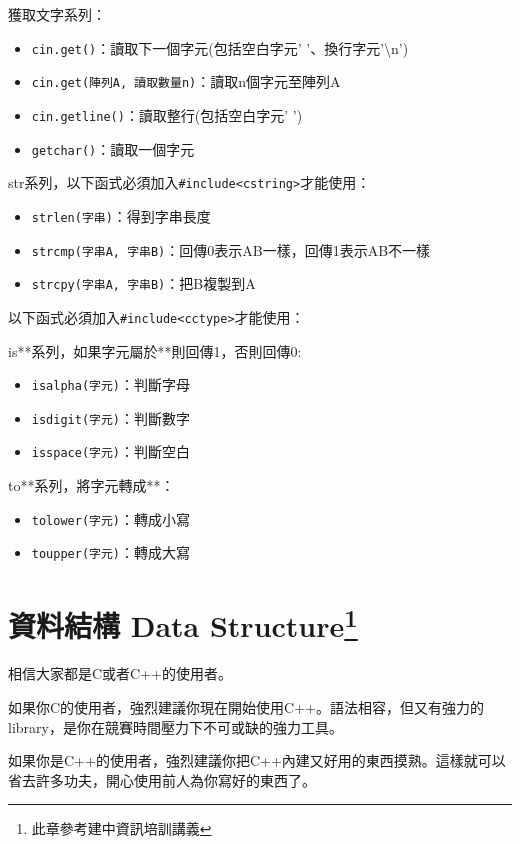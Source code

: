 \documentclass[a4paper, 11pt, oneside]{book}
\begin{document}
獲取文字系列：
\begin{itemize}
    \item \texttt{cin.get()}：讀取下一個字元(包括空白字元' '、換行字元'\textbackslash{}n')
    \item \texttt{cin.get(陣列A, 讀取數量n)}：讀取n個字元至陣列A
    \item \texttt{cin.getline()}：讀取整行(包括空白字元' ')
    \item \texttt{getchar()}：讀取一個字元
\end{itemize}
str系列，以下函式必須加入\texttt{\#include<cstring>}才能使用：
\begin{itemize}
    \item \texttt{strlen(字串)}：得到字串長度
    \item \texttt{strcmp(字串A, 字串B)}：回傳0表示AB一樣，回傳1表示AB不一樣
    \item \texttt{strcpy(字串A, 字串B)}：把B複製到A
\end{itemize}
以下函式必須加入\texttt{\#include<cctype>}才能使用：

is**系列，如果字元屬於**則回傳1，否則回傳0:
\begin{itemize}
    \item \texttt{isalpha(字元)}：判斷字母
    \item \texttt{isdigit(字元)}：判斷數字
    \item \texttt{isspace(字元)}：判斷空白
\end{itemize}

to**系列，將字元轉成**：
\begin{itemize}
    \item \texttt{tolower(字元)}：轉成小寫
    \item \texttt{toupper(字元)}：轉成大寫
\end{itemize}

\chapter[資料結構 Data Structure]{資料結構 Data Structure\footnote{此章參考建中資訊培訓講義}}

相信大家都是C或者C++的使用者。

如果你C的使用者，強烈建議你現在開始使用C++。語法相容，但又有強力的library，是你在競賽時間壓力下不可或缺的強力工具。

如果你是C++的使用者，強烈建議你把C++內建又好用的東西摸熟。這樣就可以省去許多功夫，開心使用前人為你寫好的東西了。
\end{document}
